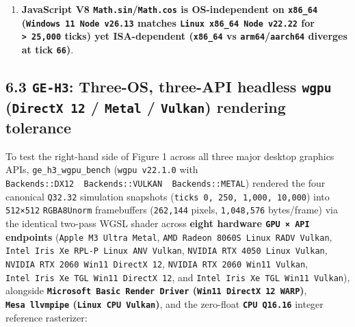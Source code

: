 \documentclass[10pt,letterpaper]{article}
\begin{document}
\begin{enumerate}
  (\texttt{t\_\allowbreak{}div\_\allowbreak{}gameplay\ =\ 8,\allowbreak{}869}) from \texttt{Clang\ 21}'s
  default \texttt{-\allowbreak{}O3\ -\allowbreak{}mavx2\ -\allowbreak{}mfma} (\texttt{-\allowbreak{}ffp-\allowbreak{}contract=fast} on by
  default). Even when both compilers enable contraction, LLVM lowers
  negated multiply-subtract differently across \texttt{x86\_64}
  (\texttt{VFMADD}/\allowbreak{}\texttt{VFNMADD}) and \texttt{AArch64}
  (\texttt{FMADD}/\allowbreak{}\texttt{FMSUB}), diverging at tick \texttt{406}
  (\texttt{t\_\allowbreak{}div\_\allowbreak{}gameplay\ =\ 11,\allowbreak{}205}).
\item
  \textbf{JavaScript V8 \texttt{Math.sin}/\allowbreak{}\texttt{Math.cos} is
  OS-independent on \texttt{x86\_64} (\texttt{Windows\ 11\ Node\ v26.\allowbreak{}13}
  matches \texttt{Linux\ x86\_\allowbreak{}64\ Node\ v22.\allowbreak{}22} for
  \texttt{\textgreater{}\ 25,000} ticks) yet ISA-dependent
  (\texttt{x86\_64} vs \texttt{arm64}/\allowbreak{}\texttt{aarch64} diverges at tick
  \texttt{66})}.
\end{enumerate}

\subsection{\texorpdfstring{6.3 \texttt{GE-H3}: Three-OS, three-API
headless \texttt{wgpu} (\texttt{DirectX\ 12} / \texttt{Metal} /
\texttt{Vulkan}) rendering
tolerance}{6.3 GE-H3: Three-OS, three-API headless wgpu (DirectX 12 / Metal / Vulkan) rendering tolerance}}\label{ge-h3-three-os-three-api-headless-wgpu-directx-12-metal-vulkan-rendering-tolerance}

To test the right-hand side of Figure 1 across all three major desktop
graphics APIs, \texttt{ge\_\allowbreak{}h3\_\allowbreak{}wgpu\_\allowbreak{}bench} (\texttt{wgpu\ v22.\allowbreak{}1.\allowbreak{}0} with
\texttt{Backends::DX12\ \textbar{}\ Backends::VULKAN\ \textbar{}\ Backends::METAL})
rendered the four canonical \texttt{Q32.32} simulation snapshots
(\texttt{ticks\ 0,\allowbreak{}\ 250,\allowbreak{}\ 1,\allowbreak{}000,\allowbreak{}\ 10,\allowbreak{}000}) into \texttt{512×512}
\texttt{RGBA8Unorm} framebuffers (\texttt{262,144} pixels,
\texttt{1,048,576} bytes/frame) via the identical two-pass WGSL shader
across \textbf{eight hardware \texttt{GPU\ ×\ API} endpoints}
(\texttt{Apple\ M3\ Ultra\ Metal},
\texttt{AMD\ Radeon\ 8060S\ Linux\ RADV\ Vulkan},
\texttt{Intel\ Iris\ Xe\ RPL-\allowbreak{}P\ Linux\ ANV\ Vulkan},
\texttt{NVIDIA\ RTX\ 4050\ Linux\ Vulkan},
\texttt{NVIDIA\ RTX\ 2060\ Win11\ DirectX\ 12},
\texttt{NVIDIA\ RTX\ 2060\ Win11\ Vulkan},
\texttt{Intel\ Iris\ Xe\ TGL\ Win11\ DirectX\ 12}, and
\texttt{Intel\ Iris\ Xe\ TGL\ Win11\ Vulkan}), alongside
\textbf{\texttt{Microsoft\ Basic\ Render\ Driver}
(\texttt{Win11\ DirectX\ 12\ WARP})}, \textbf{\texttt{Mesa\ llvmpipe}
(\texttt{Linux\ CPU\ Vulkan})}, and the zero-float
\textbf{\texttt{CPU\ Q16.\allowbreak{}16}} integer reference rasterizer:
\end{document}
